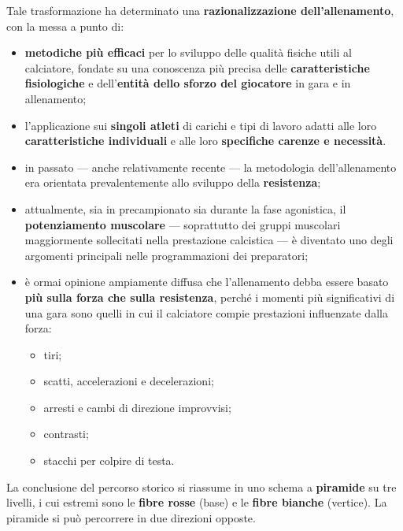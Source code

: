 Tale trasformazione ha determinato una \textbf{razionalizzazione dell'allenamento}, con la messa a
punto di:
\begin{itemize}
  \item \textbf{metodiche più efficaci} per lo sviluppo delle qualità fisiche utili al calciatore,
    fondate su una conoscenza più precisa delle \textbf{caratteristiche fisiologiche} e
    dell'\textbf{entità dello sforzo del giocatore} in gara e in allenamento;
  \item l'applicazione sui \textbf{singoli atleti} di carichi e tipi di lavoro adatti alle loro
    \textbf{caratteristiche individuali} e alle loro \textbf{specifiche carenze e necessità}.
\end{itemize}

\begin{itemize}
  \item in passato --- anche relativamente recente --- la metodologia dell'allenamento era
    orientata prevalentemente allo sviluppo della \textbf{resistenza};
  \item attualmente, sia in precampionato sia durante la fase agonistica, il \textbf{potenziamento
    muscolare} --- soprattutto dei gruppi muscolari maggiormente sollecitati nella prestazione
    calcistica --- è diventato uno degli argomenti principali nelle programmazioni dei preparatori;
  \item è ormai opinione ampiamente diffusa che l'allenamento debba essere basato \textbf{più sulla
    forza che sulla resistenza}, perché i momenti più significativi di una gara sono quelli in cui
    il calciatore compie prestazioni influenzate dalla forza:
    \begin{itemize}
      \item tiri;
      \item scatti, accelerazioni e decelerazioni;
      \item arresti e cambi di direzione improvvisi;
      \item contrasti;
      \item stacchi per colpire di testa.
    \end{itemize}
\end{itemize}

La conclusione del percorso storico si riassume in uno schema a \textbf{piramide} su tre livelli,
i cui estremi sono le \textbf{fibre rosse} (base) e le \textbf{fibre bianche} (vertice). La
piramide si può percorrere in due direzioni opposte.

